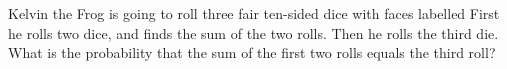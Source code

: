 Kelvin the Frog is going to roll three fair ten-sided dice with faces labelled  First he rolls two dice, and finds the sum of the two rolls. Then he rolls the third die. What is the probability that the sum of the first two rolls equals the third roll?